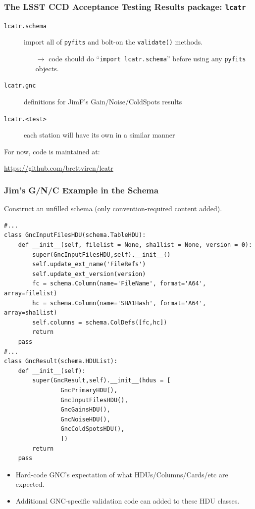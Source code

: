\documentclass[xcolor=dvipsnames]{beamer}
\begin{document}
\begin{frame}[fragile]
  \frametitle{The LSST CCD Acceptance Testing Results package: \texttt{lcatr}}
  \begin{description}
  \item[\texttt{lcatr.schema}] import all of \texttt{pyfits} and
    bolt-on the \texttt{validate()} methods.
    \begin{itemize}
    \item [$\rightarrow$] code should do ``\texttt{import lcatr.schema}'' before using any \texttt{pyfits} objects.
    \end{itemize}
  \item[\texttt{lcatr.gnc}] definitions for JimF's Gain/Noise/ColdSpots results
  \item[\texttt{lcatr.<test>}] each station will have its own in a similar manner
  \end{description}

  For now, code is maintained at:
  \begin{center}
    \url{https://github.com/brettviren/lcatr}    
  \end{center}
\end{frame}

\begin{frame}[fragile]
  \frametitle{Jim's G/N/C Example in the Schema}

  Construct an unfilled schema (only convention-required content added).

  \begin{lstlisting}[emph={GncInputFilesHDU,GncResult,schema,TableHDU,Column}]
#...
class GncInputFilesHDU(schema.TableHDU):
    def __init__(self, filelist = None, sha1list = None, version = 0):
        super(GncInputFilesHDU,self).__init__()
        self.update_ext_name('FileRefs')
        self.update_ext_version(version)
        fc = schema.Column(name='FileName', format='A64', array=filelist)
        hc = schema.Column(name='SHA1Hash', format='A64', array=sha1list)
        self.columns = schema.ColDefs([fc,hc])
        return
    pass
#...
class GncResult(schema.HDUList):
    def __init__(self):
        super(GncResult,self).__init__(hdus = [
                GncPrimaryHDU(),
                GncInputFilesHDU(),
                GncGainsHDU(),
                GncNoiseHDU(),
                GncColdSpotsHDU(),
                ])
        return
    pass
  \end{lstlisting}
  \footnotesize
  \begin{itemize}
  \item   Hard-code GNC's expectation of what HDUs/Columns/Cards/etc are expected.
  \item   Additional GNC-specific validation code can added to these HDU classes.

  \end{itemize}
\end{frame}
\end{document}
